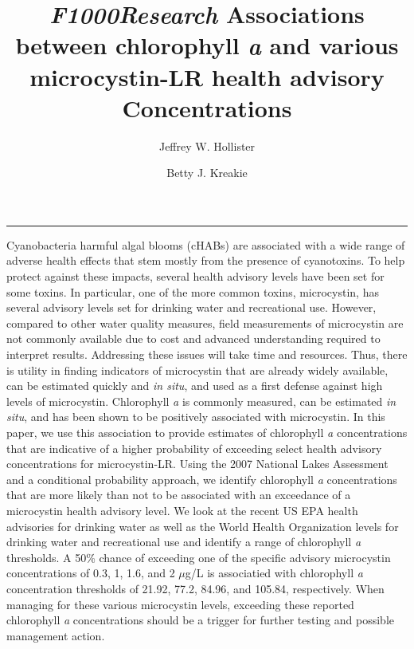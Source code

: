 \documentclass[10pt,a4paper,twocolumn]{article}
\begin{document}
\title{\textit{F1000Research} Associations between chlorophyll \emph{a} and various microcystin-LR
health advisory Concentrations}
\author[1]{Jeffrey W. Hollister}
\author[1]{Betty J. Kreakie}
\affil[1]{}

\maketitle
\thispagestyle{fancy}

\begin{abstract}



\end{abstract}

\clearpage

\singlespace

\vspace{2mm}

\hrule

Cyanobacteria harmful algal blooms (cHABs) are associated with a wide
range of adverse health effects that stem mostly from the presence of
cyanotoxins. To help protect against these impacts, several health
advisory levels have been set for some toxins. In particular, one of the
more common toxins, microcystin, has several advisory levels set for
drinking water and recreational use. However, compared to other water
quality measures, field measurements of microcystin are not commonly
available due to cost and advanced understanding required to interpret
results. Addressing these issues will take time and resources. Thus,
there is utility in finding indicators of microcystin that are already
widely available, can be estimated quickly and \emph{in situ}, and used
as a first defense against high levels of microcystin. Chlorophyll
\emph{a} is commonly measured, can be estimated \emph{in situ}, and has
been shown to be positively associated with microcystin. In this paper,
we use this association to provide estimates of chlorophyll \emph{a}
concentrations that are indicative of a higher probability of exceeding
select health advisory concentrations for microcystin-LR. Using the 2007
National Lakes Assessment and a conditional probability approach, we
identify chlorophyll \emph{a} concentrations that are more likely than
not to be associated with an exceedance of a microcystin health advisory
level. We look at the recent US EPA health advisories for drinking water
as well as the World Health Organization levels for drinking water and
recreational use and identify a range of chlorophyll \emph{a}
thresholds. A 50\% chance of exceeding one of the specific advisory
microcystin concentrations of 0.3, 1, 1.6, and 2 \(\mu\)g/L is
associatied with chlorophyll \emph{a} concentration thresholds of 21.92,
77.2, 84.96, and 105.84, respectively. When managing for these various
microcystin levels, exceeding these reported chlorophyll \emph{a}
concentrations should be a trigger for further testing and possible
management action.
\end{document}

